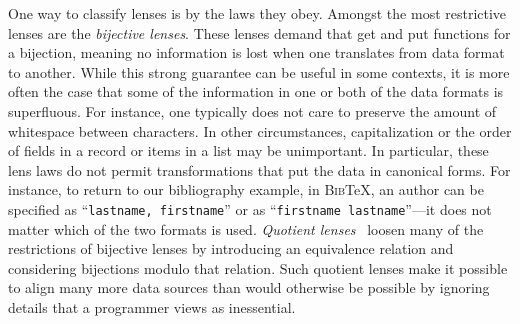 \documentclass[acmsmall,review,anonymous]{acmart}\settopmatter{printfolios=true,printccs=false,printacmref=false}
\newcommand{\bibtex}{\textsc{Bib}\TeX{}}
\newcommand{\cd}[1]{\lstinline[backgroundcolor=\color{white}]$#1$}
\begin{document}
One way to classify lenses is by the laws they obey.  Amongst the most
restrictive lenses are the \emph{bijective lenses}.  These lenses demand
that get and put functions for a bijection, meaning no information
is lost when one translates from data format to another.  While this
strong guarantee can be useful in some contexts, it is more often the case
that some of the information in one or both of the data formats is superfluous.
For instance, one typically does not care to preserve the amount of
whitespace between characters.  In other circumstances, capitalization
or the order of fields in a record or items in a list may be unimportant.
%
In particular, these lens laws do not permit transformations that put the data
in canonical forms.
For instance, to return to our bibliography example, in \bibtex{},
an author can be specified as
``\cd{lastname, firstname}'' or as ``\cd{firstname lastname}''---it does not matter which of the
two formats is used.
{\em Quotient lenses}~\cite{quotientlenses} loosen many of the restrictions
of bijective lenses by introducing an equivalence relation and considering
bijections modulo that relation.  Such quotient lenses make it possible
to align many more data sources than would otherwise be possible by
ignoring details that a programmer views as inessential.
\end{document}
